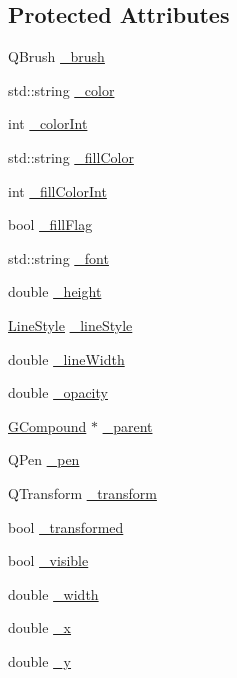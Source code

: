 \subsection*{Protected Attributes}
\begin{DoxyCompactItemize}
\item 
Q\+Brush \mbox{\hyperlink{classGObject_aab24462ec896b596d99911767b0912d0}{\+\_\+brush}}
\item 
std\+::string \mbox{\hyperlink{classGObject_a1134e770ae4315ea8bc1201e2f21da8b}{\+\_\+color}}
\item 
int \mbox{\hyperlink{classGObject_a003fdd343d9b7505c53a8b7a134200ed}{\+\_\+color\+Int}}
\item 
std\+::string \mbox{\hyperlink{classGObject_a179f8d6cee65cd8a54692e32b224392a}{\+\_\+fill\+Color}}
\item 
int \mbox{\hyperlink{classGObject_a751def333a67d651e5b99cc331ecb496}{\+\_\+fill\+Color\+Int}}
\item 
bool \mbox{\hyperlink{classGObject_ad4a55cbcd61b58a4d49666490bb2f103}{\+\_\+fill\+Flag}}
\item 
std\+::string \mbox{\hyperlink{classGObject_aea76ea1a8b5dd7b0a78653277e63b536}{\+\_\+font}}
\item 
double \mbox{\hyperlink{classGObject_ad05df29e7f27fc504abd743e3d8b4e73}{\+\_\+height}}
\item 
\mbox{\hyperlink{classGObject_a86e0f5648542856159bb40775c854aa7}{Line\+Style}} \mbox{\hyperlink{classGObject_a89bafecaafb7c72d55c7efc10b7d0523}{\+\_\+line\+Style}}
\item 
double \mbox{\hyperlink{classGObject_a16e9033665937f13de2e163dc2184aff}{\+\_\+line\+Width}}
\item 
double \mbox{\hyperlink{classGObject_a20eff8eb7af27182edc9bfc54768b6f3}{\+\_\+opacity}}
\item 
\mbox{\hyperlink{classGCompound}{G\+Compound}} $\ast$ \mbox{\hyperlink{classGObject_ac9452c1eaff70eebddbb318196aa3835}{\+\_\+parent}}
\item 
Q\+Pen \mbox{\hyperlink{classGObject_afb69d172743f868299847174eb1b6bc8}{\+\_\+pen}}
\item 
Q\+Transform \mbox{\hyperlink{classGObject_a475b8860a5f1adb4a1fdc58d1f5c1e32}{\+\_\+transform}}
\item 
bool \mbox{\hyperlink{classGObject_ae4725802fc8d8aaa0ab4bd4781f7e07c}{\+\_\+transformed}}
\item 
bool \mbox{\hyperlink{classGObject_a9312c72508471b7c7a87b540263e1af4}{\+\_\+visible}}
\item 
double \mbox{\hyperlink{classGObject_ab55d85a3371770e6725b1062cf160cd8}{\+\_\+width}}
\item 
double \mbox{\hyperlink{classGObject_a6675b83b27137b8d3aa2ad8133078ea6}{\+\_\+x}}
\item 
double \mbox{\hyperlink{classGObject_a2f0f6aeafddc8a39c578bfa7e22b5f1e}{\+\_\+y}}
\end{DoxyCompactItemize}


